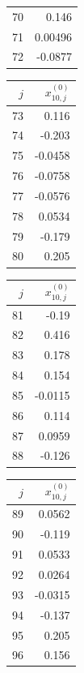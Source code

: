 {\begin{tabular}[t]{r|r}
70 & 0.146 \\
71 & 0.00496 \\
72 & -0.0877
\end{tabular}\kern4pt
\begin{tabular}[t]{r|r}
$j$ & $x^{(0)}_{10,j}$ \\\hline
73 & 0.116 \\
74 & -0.203 \\
75 & -0.0458 \\
76 & -0.0758 \\
77 & -0.0576 \\
78 & 0.0534 \\
79 & -0.179 \\
80 & 0.205
\end{tabular}\kern4pt
\begin{tabular}[t]{r|r}
$j$ & $x^{(0)}_{10,j}$ \\\hline
81 & -0.19 \\
82 & 0.416 \\
83 & 0.178 \\
84 & 0.154 \\
85 & -0.0115 \\
86 & 0.114 \\
87 & 0.0959 \\
88 & -0.126
\end{tabular}\kern4pt
\begin{tabular}[t]{r|r}
$j$ & $x^{(0)}_{10,j}$ \\\hline
89 & 0.0562 \\
90 & -0.119 \\
91 & 0.0533 \\
92 & 0.0264 \\
93 & -0.0315 \\
94 & -0.137 \\
95 & 0.205 \\
96 & 0.156
\end{tabular}}

